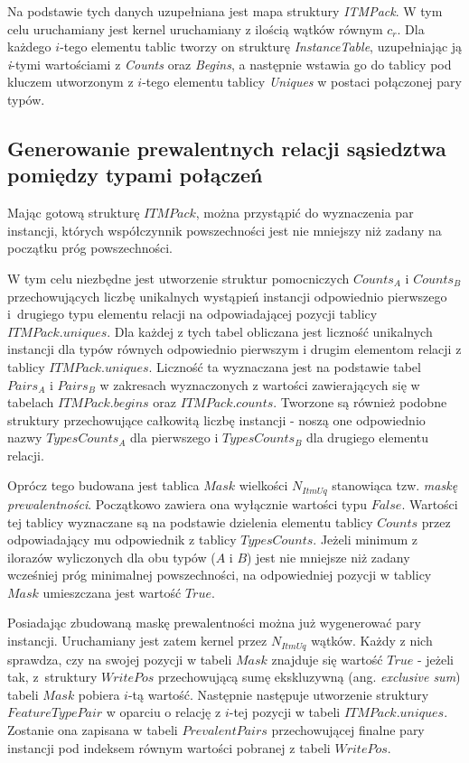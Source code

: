 \documentclass[12pt]{article}
\begin{document}
Na podstawie tych danych uzupełniana jest mapa struktury \textit{ITMPack}. W tym celu uruchamiany jest kernel uruchamiany z ilością wątków równym $ c_{r} $. Dla każdego $ i $-tego elementu tablic tworzy on strukturę \textit{InstanceTable}, uzupełniając ją \textit{i}-tymi wartościami z \textit{Counts} oraz \textit{Begins}, a następnie wstawia go do tablicy pod kluczem utworzonym z $i$-tego elementu tablicy \textit{Uniques} w postaci połączonej pary typów. 

\subsection{Generowanie prewalentnych relacji sąsiedztwa pomiędzy typami połączeń}

Mając gotową strukturę $ ITMPack $, można przystąpić do wyznaczenia par instancji, których współczynnik powszechności jest nie mniejszy niż zadany na początku próg powszechności. 

W tym celu niezbędne jest utworzenie struktur pomocniczych $ Counts_{A} $ i $ Counts_{B} $ przechowujących liczbę unikalnych wystąpień instancji odpowiednio pierwszego i~drugiego typu elementu relacji na odpowiadającej pozycji tablicy $ ITMPack.uniques $. Dla każdej z tych tabel obliczana jest liczność unikalnych instancji dla typów równych odpowiednio pierwszym i drugim elementom relacji z tablicy \linebreak $ ITMPack.uniques $. Liczność ta wyznaczana jest na podstawie tabel $ Pairs_{A} $ i $ Pairs_{B} $ w zakresach wyznaczonych z wartości zawierających się w tabelach $ ITMPack.begins $ oraz $ ITMPack.counts $. Tworzone są również podobne struktury przechowujące całkowitą liczbę instancji - noszą one odpowiednio nazwy $ TypesCounts_{A} $ dla pierwszego i $ TypesCounts_{B} $ dla drugiego elementu relacji.

Oprócz tego budowana jest tablica $ Mask $ wielkości $ N_{ItmUq} $ stanowiąca tzw. \textit{maskę prewalentności}. Początkowo zawiera ona wyłącznie wartości typu $ False $. Wartości tej tablicy wyznaczane są na podstawie dzielenia elementu tablicy $ Counts $ przez odpowiadający mu odpowiednik z tablicy $ TypesCounts $. Jeżeli minimum z ilorazów wyliczonych dla obu typów ($ A $ i $ B $) jest nie mniejsze niż zadany wcześniej próg minimalnej powszechności, na odpowiedniej pozycji w tablicy $ Mask $ umieszczana jest wartość $ True $.

Posiadając zbudowaną maskę prewalentności można już wygenerować pary instancji. Uruchamiany jest zatem kernel przez $ N_{ItmUq} $ wątków. Każdy z nich sprawdza, czy na swojej pozycji w tabeli $ Mask $ znajduje się wartość $ True $ - jeżeli tak, z~struktury $ WritePos $ przechowującą sumę ekskluzywną (ang. \textit{exclusive sum}) tabeli $ Mask $ pobiera $i$-tą wartość. Następnie następuje utworzenie struktury \linebreak $ FeatureTypePair $ w oparciu o relację z $ i $-tej pozycji w tabeli $ ITMPack.uniques$. Zostanie ona zapisana w tabeli $ PrevalentPairs $ przechowującej finalne pary instancji pod indeksem równym wartości pobranej z tabeli $ WritePos $.
\end{document}
